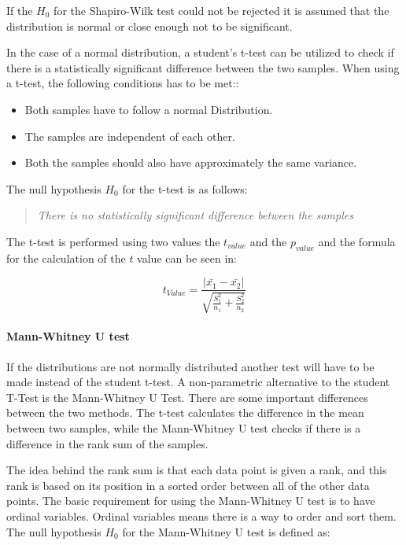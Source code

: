 If the $H_0$ for the Shapiro-Wilk test could not be rejected it is assumed that the distribution is normal or close enough not to be significant.\newline

In the case of a normal distribution, a student's t-test can be utilized to check if there is a statistically significant difference between the two samples. When using a t-test, the following conditions has to be met:\cite{kaur2015comparative}:

\begin{itemize}
    \item Both samples have to follow a normal Distribution.
    \item The samples are independent of each other.
    \item Both the samples should also have approximately the same variance.
\end{itemize}

The null hypothesis $H_0$ for the t-test is as follows:

\begin{quote}
    \textit{There is no statistically significant difference between the samples}    
\end{quote}

The t-test is performed using two values the $t_{value}$ and the $p_{value}$ and the formula for the calculation of the $t$ value can be seen in:

\begin{equation}
    t_{Value} = \frac{|\bar{x_1}- \bar{x_2}|}{\sqrt{\frac{S_1^2}{n_1} + \frac{S_2^2}{n_2}}}  
\end{equation}

\paragraph{Mann-Whitney U test}
If the distributions are not normally distributed another test will have to be made instead of the student t-test. A non-parametric alternative to the student T-Test is the Mann-Whitney U Test\cite{kaur2015comparative}. There are some important differences between the two methods. The t-test calculates the difference in the mean between two samples, while the Mann-Whitney U test checks if there is a difference in the rank sum of the samples.\cite{mann1947test}\newline

The idea behind the rank sum is that each data point is given a rank, and this rank is based on its position in a sorted order between all of the other data points. The basic requirement for using the Mann-Whitney U test is to have ordinal variables. Ordinal variables means there is a way to order and sort them. The null hypothesis $H_0$ for the Mann-Whitney U test is defined as:

